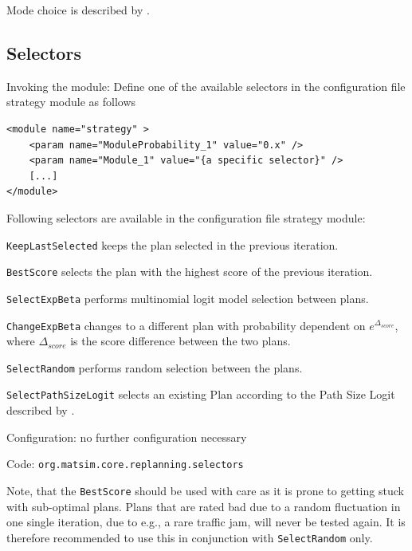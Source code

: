 Mode choice is described by \citet[][]{RieserEtAl_TRR_2009, MeisterEtAl_WCTRS_2010, CiariEtAl_STRC_2008, CiariEtAl_STRC_2007}.

\subsection{Selectors}
\label{sec:selectors}
\begin{compactitem}
\item Invoking the module: Define one of the available selectors in the configuration file strategy module as follows
%
\begin{lstlisting}
<module name="strategy" >
    <param name="ModuleProbability_1" value="0.x" />
    <param name="Module_1" value="{a specific selector}" />
    [...]
</module>
\end{lstlisting}
%
Following selectors are available in the configuration file strategy module:
%
\begin{compactitem}
	\item \lstinline|KeepLastSelected| keeps the plan selected in the previous iteration.
	\item \lstinline|BestScore| selects the plan with the highest score of the previous iteration.
	\item \lstinline|SelectExpBeta| performs multinomial logit model selection between plans.
	\item \lstinline|ChangeExpBeta| changes to a different plan with probability dependent on $e^{\Delta_{score}}$, where $\Delta_{score}$ is the score difference between the two plans.
	\item \lstinline|SelectRandom| performs random selection between the plans.
	\item \lstinline|SelectPathSizeLogit| selects an existing Plan according to the Path Size Logit described by \citet[][]{FrejingerBierlaire_TransResB_2007}.
\end{compactitem}
%
\item Configuration: no further configuration necessary 
\item Code: \lstinline|org.matsim.core.replanning.selectors|
\end{compactitem}

Note, that the \lstinline|BestScore| should be used with care as it is prone to getting stuck with sub-optimal plans. Plans that are rated bad due to a random fluctuation in one single iteration, due to e.g., a rare traffic jam, will never be tested again. It is therefore recommended to use this in conjunction with \lstinline|SelectRandom| only.

